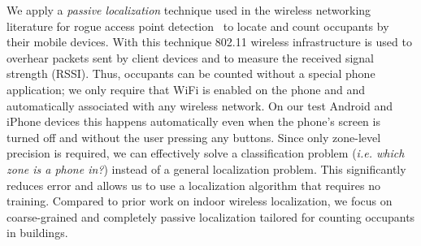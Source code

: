 We apply a {\it passive localization} technique used in the wireless networking literature for rogue access point detection~\cite{Faria2006, Laurendeau2010} to locate and count occupants by their mobile devices. With this technique 802.11 wireless infrastructure is used to overhear packets sent by client devices and to measure the received signal strength (RSSI). Thus, occupants can be counted without a special phone application; we only require that WiFi is enabled on the phone and and automatically associated with any wireless network. On our test Android and iPhone devices this happens automatically even when the phone's screen is turned off and without the user pressing any buttons. Since only zone-level precision is required, we can effectively solve a classification problem ({\it i.e. which zone is a phone in?}) instead of a general localization problem. This significantly reduces error and allows us to use a localization algorithm that requires no training. Compared to prior work on indoor wireless localization, we focus on coarse-grained and completely passive localization tailored for counting occupants in buildings.









